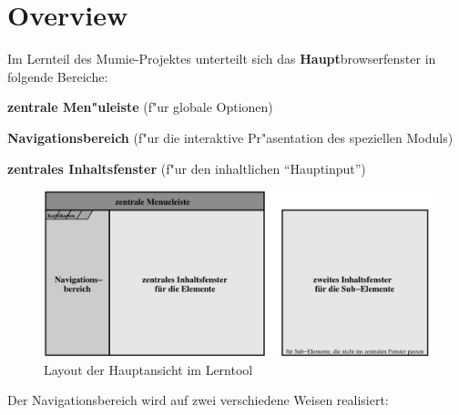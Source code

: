 
\section{Overview}\label{overview}

Im Lernteil des Mumie-Projektes unterteilt sich das
\textbf{Haupt}browserfenster in folgende Bereiche:

\begin{list_sabina}
        \item \textbf{zentrale Men"uleiste} (f"ur globale Optionen)
        \item \textbf{Navigationsbereich} (f"ur die interaktive Pr"asentation des speziellen Moduls)
        \item \textbf{zentrales Inhaltsfenster} (f"ur den inhaltlichen ``Hauptinput'')
\end{list_sabina}

\begin{figure}[h]
\begin{center}
\ifx\pdfoutput\undefined
\else
  \includegraphics{Skizzen/gesamtszenario_01.pdf}
\fi
\caption{Layout der Hauptansicht im Lerntool}
\end{center}
\end{figure}


Der Navigationsbereich wird auf zwei verschiedene Weisen realisiert:


